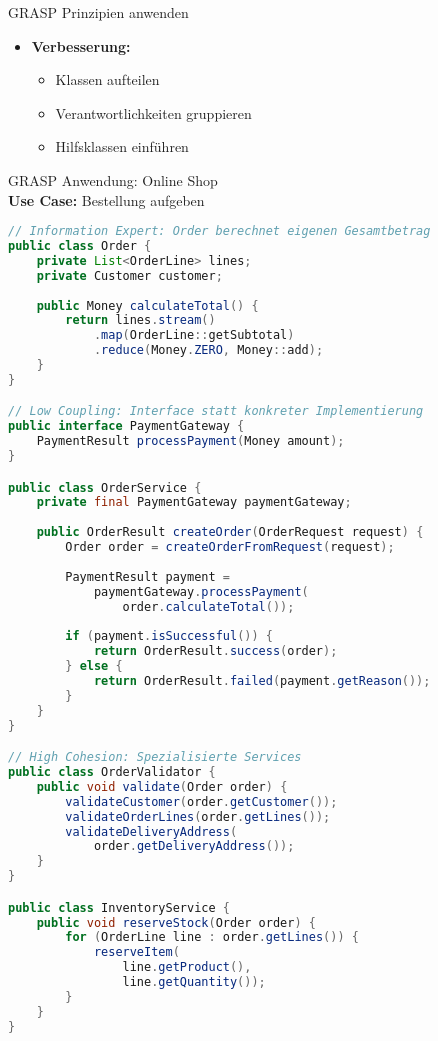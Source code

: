 \begin{KR}{GRASP Prinzipien anwenden}
\begin{itemize}
    \item \textbf{Verbesserung:}
    \begin{itemize}
        \item Klassen aufteilen
        \item Verantwortlichkeiten gruppieren
        \item Hilfsklassen einführen
    \end{itemize}
\end{itemize}
\end{KR}

\begin{example2}[breakable]{GRASP Anwendung: Online Shop}\\
\textbf{Use Case:} Bestellung aufgeben

\begin{lstlisting}[language=Java, style=basesmol]
// Information Expert: Order berechnet eigenen Gesamtbetrag
public class Order {
    private List<OrderLine> lines;
    private Customer customer;
    
    public Money calculateTotal() {
        return lines.stream()
            .map(OrderLine::getSubtotal)
            .reduce(Money.ZERO, Money::add);
    }
}

// Low Coupling: Interface statt konkreter Implementierung
public interface PaymentGateway {
    PaymentResult processPayment(Money amount);
}

public class OrderService {
    private final PaymentGateway paymentGateway;
    
    public OrderResult createOrder(OrderRequest request) {
        Order order = createOrderFromRequest(request);
        
        PaymentResult payment = 
            paymentGateway.processPayment(
                order.calculateTotal());
                
        if (payment.isSuccessful()) {
            return OrderResult.success(order);
        } else {
            return OrderResult.failed(payment.getReason());
        }
    }
}

// High Cohesion: Spezialisierte Services
public class OrderValidator {
    public void validate(Order order) {
        validateCustomer(order.getCustomer());
        validateOrderLines(order.getLines());
        validateDeliveryAddress(
            order.getDeliveryAddress());
    }
}

public class InventoryService {
    public void reserveStock(Order order) {
        for (OrderLine line : order.getLines()) {
            reserveItem(
                line.getProduct(), 
                line.getQuantity());
        }
    }
}
\end{lstlisting}
\end{example2}

